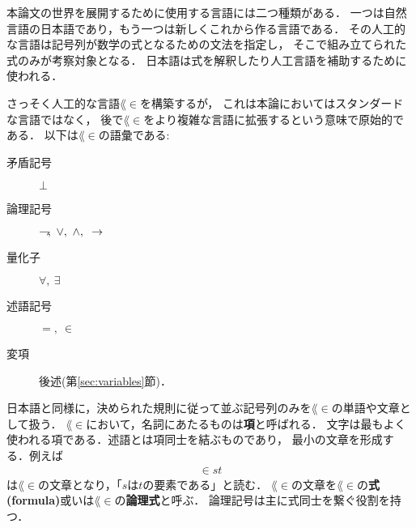 	本論文の世界を展開するために使用する言語には二つ種類がある．
	一つは自然言語の日本語であり，もう一つは新しくこれから作る言語である．
	その人工的な言語は記号列が数学の式となるための文法を指定し，
	そこで組み立てられた式のみが考察対象となる．
	日本語は式を解釈したり人工言語を補助するために使われる．
	
	さっそく人工的な言語$\lang{\in}$を構築するが，
	これは本論においてはスタンダードな言語ではなく，
	後で$\lang{\in}$をより複雑な言語に拡張するという意味で原始的である．
	以下は$\lang{\in}$の語彙である:
	\begin{description}
		\item[矛盾記号] $\bot$
		\item[論理記号] $\negation,\ \vee,\ \wedge,\ \rarrow$
		\item[量化子] $\forall,\ \exists$
		\item[述語記号] $=,\ \in$
		\item[変項] 後述(第\ref{sec:variables}節)．
			
			
	\end{description}
	
	日本語と同様に，決められた規則に従って並ぶ記号列のみを$\lang{\in}$の単語や文章として扱う．
	$\lang{\in}$において，名詞にあたるものは{\bf 項}と呼ばれる．
	文字は最もよく使われる項である．述語とは項同士を結ぶものであり，
	最小の文章を形成する．例えば
	\begin{align}
		\in st
	\end{align}
	は$\lang{\in}$の文章となり，「$s$は$t$の要素である」と読む．
	$\lang{\in}$の文章を$\lang{\in}$の{\bf 式}
	{\bf (formula)}或いは$\lang{\in}$の{\bf 論理式}と呼ぶ．
	論理記号は主に式同士を繋ぐ役割を持つ．
	
